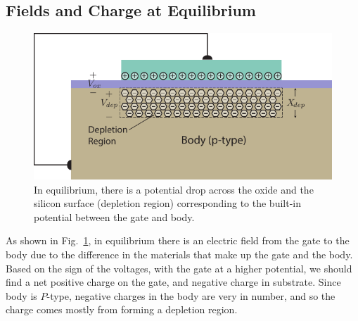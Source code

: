 \subsection{Fields and Charge at Equilibrium}
\begin{figure}[tbh]
\centering
\includegraphics[width=.75\columnwidth]{mos_cap_equilibrium}
\caption{In equilibrium, there is a potential drop across the oxide and the silicon surface (depletion region) corresponding to the built-in potential between the gate and body.}
\label{fig:mos_charge_equil}
\end{figure}
As shown in Fig.~\ref{fig:mos_charge_equil}, in equilibrium there is an electric field from the gate to the body due to the difference in the materials that make up the gate and the body.  Based on the sign of the voltages, with the gate at a higher potential, we should find a net positive charge on the gate, and negative charge in substrate.   Since body is $P$-type, negative charges in the body are very in number, and so the charge comes mostly from forming a depletion region.
